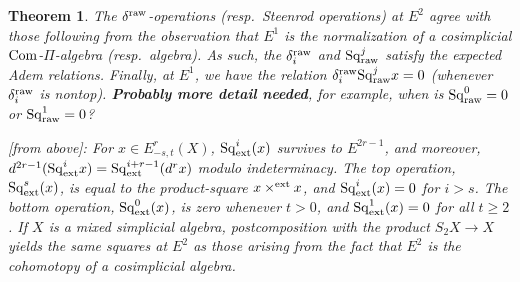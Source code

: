 \documentclass[11pt]{amsart}
\theoremstyle{plain}
\newtheorem{thm}{Theorem}[section]
\theoremstyle{definition}
\renewcommand{\to}{\longrightarrow}
\theoremstyle{plain}
\newcommand{\Sq}{\mathrm{Sq}}
\begin{document}
\begin{second quadrant homotopy}
\begin{thm}
The $\delta^\textup{raw}$-operations (resp.\ Steenrod operations)  at $E^2$ agree with those following from the observation that $E^1$ is the normalization of a cosimplicial $\textup{Com}$-$\Pi$-algebra (resp.\ algebra). As such, the $\delta_i^\textup{raw}$ and $\Sq^j_\textup{raw}$ satisfy the expected Adem relations. Finally, at $E^1$, we have the relation $\delta_i^\textup{raw}\Sq^j_\textup{raw}x=0$ (whenever $\delta_i^\textup{raw}$ is nontop). \textbf{Probably more detail needed}, for example, when is $\Sq_\textup{raw}^0=0$ or $\Sq_\textup{raw}^1=0$?

[from above]: For $x\in E^r_{-s,t}(X)$, $\Sq^i_\textup{ext}(x)$ survives to $E^{2r-1}$, and moreover, $d^{2r-1}(\Sq^i_\textup{ext}x)=\Sq^{i+r-1}_\textup{ext}(d^rx)$ modulo indeterminacy. The top operation, $\Sq^s_\textup{ext}(x)$, is equal to the product-square $x\times^\textup{ext} x$, and $\Sq^i_\textup{ext}(x)=0$ for $i>s$. The bottom operation, $\Sq^0_\textup{ext}(x)$, is zero whenever $t>0$, and $\Sq^1_\textup{ext}(x)=0$ for all $t\geq2$. If $X$ is a mixed simplicial algebra, postcomposition with the product $S_2X\to X$ yields the same squares at $E^2$ as those arising from the fact that $E^2$ is the cohomotopy of a cosimplicial algebra.
\end{thm}

\end{second quadrant homotopy}
\end{document}
